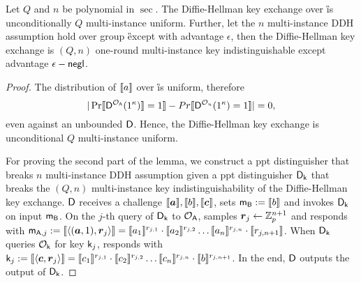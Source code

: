 

\begin{lemma}\label{lem:DDH}
Let $Q$ and $n$ be polynomial in $\sec$.
The Diffie-Hellman key exchange over \G is unconditionally $Q$ multi-instance uniform. Further, let the $n$ multi-instance DDH assumption hold over group \G except with advantage $\epsilon$, then the Diffie-Hellman key exchange is $(Q,n)$ one-round multi-instance key indistinguishable except advantage $\epsilon-\mathsf{negl}$. 
\end{lemma}

\begin{proof}
The distribution of $\llbracket a\rrbracket$ over \G is uniform, therefore 
$$
|\Pr\llbracket \mathsf D^{\mathcal{O}_{\mathsf{A}}}(1^{\kappa})\rrbracket=1\rrbracket-Pr\llbracket \mathsf D^{\mathcal{O}_{u}}(1^{\kappa})=1\rrbracket|=0,
$$
even against an unbounded $\mathsf D$. Hence, the Diffie-Hellman key exchange is unconditional $Q$ multi-instance uniform.

For proving the second part of the lemma, we construct a ppt distinguisher \D that breaks $n$ multi-instance DDH assumption given a ppt distinguisher $\mathsf D_\mathsf{k}$ that breaks the $(Q,n)$ multi-instance key indistinguishability of the Diffie-Hellman key exchange. $\mathsf D$ receives a challenge $\lb \vec{a}\rb,\lb b\rb,\lb \vec{c}\rb$, sets $\mathsf{m}_{\mathsf{B}}:=\llbracket b\rrbracket$ and invokes $\mathsf D_{\mathsf{k}}$ on input $\mathsf{m}_{\mathsf{B}}$. On the $j$-th query of $\mathsf D_{\mathsf{k}}$ to $\mathcal{O}_{\mathsf{A}}$, \D samples $\vec{r}_j\leftarrow\Z_p^{n+1}$ and responds with $\mes_{\A,j}:=\lb \langle (\vec{a},1),\vec{r}_j\rangle\rb=\lb a_1\rb^{r_{j,1}}\cdot\lb a_2\rb^{r_{j,2}}\ldots\lb a_n\rb^{r_{j,n}}\cdot\lb r_{j,n+1}\rb$. When $\mathsf D_{\mathsf{k}}$ queries $\mathcal{O}_{\mathsf{k}}$ for key $\mathsf{k}_j$, \D responds with $\key_j:=\lb \langle\vec{c},\vec{r}_j\rangle\rb=\lb c_1\rb^{r_{j,1}}\cdot\lb c_2\rb^{r_{j,2}}\ldots\lb c_n\rb^{r_{j,n}}\cdot\lb b\rb^{r_{j,n+1}}$. In the end, $\mathsf D$ outputs the output of $\mathsf D_{\mathsf{k}}$.


\end{proof}
